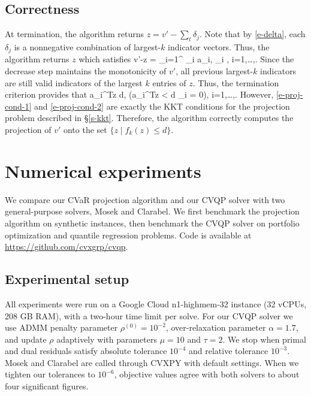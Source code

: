\documentclass[12pt]{article}
\begin{document}
\subsection{Correctness}\label{s-correctness}
At termination, the algorithm returns $z = v'-\sum_t\delta_j$.
Note that by \eqref{e-delta}, each $\delta_j$ is a nonnegative combination of
largest-$k$ indicator vectors.
Thus, the algorithm returns $z$ which satisfies
\BEQ\label{e-proj-cond-1}
    v'-z = \sum_{i=1}^{} \lambda_i a_i, \qquad \lambda_i , \quad i=1,\ldots,.
\EEQ
Since the decrease step maintains the monotonicity of $v'$,
all previous largest-$k$ indicators are still valid indicators of the largest
$k$ entries of $z$. Thus, the termination criterion provides that
\BEQ\label{e-proj-cond-2}
    a_i^Tz \leq d, \quad \left(a_i^Tz < d \implies \lambda_i = 0\right), \qquad i=1,\ldots,.
\EEQ
However, \eqref{e-proj-cond-1} and \eqref{e-proj-cond-2} are exactly
the KKT conditions for the projection problem described in \S\ref{s-kkt}.
Therefore, the algorithm correctly computes the projection of $v'$ onto the set $\{z\mid f_k(z)\leq d\}$.

\section{Numerical experiments}
\label{s-experiments}
We compare our CVaR projection algorithm and our CVQP solver with two
general-purpose solvers, Mosek and Clarabel. We first benchmark the projection
algorithm on synthetic instances, then benchmark the CVQP solver on
portfolio optimization and quantile regression problems.
Code is available at \url{https://github.com/cvxgrp/cvqp}.

\subsection{Experimental setup}
All experiments were run on a Google Cloud n1-highmem-32 instance
(32 vCPUs, 208 GB RAM), with a two-hour time limit per solve.
For our CVQP solver we use ADMM penalty parameter $\rho^{(0)} = 10^{-2}$,
over-relaxation parameter $\alpha = 1.7$, and update $\rho$ adaptively
with parameters $\mu = 10$ and $\tau = 2$.
We stop when primal and dual residuals satisfy absolute tolerance $10^{-4}$
and relative tolerance $10^{-3}$.
Mosek and Clarabel are called through CVXPY with default settings.
When we tighten our tolerances to $10^{-6}$, objective values agree with both solvers
to about four significant figures.
\end{document}
